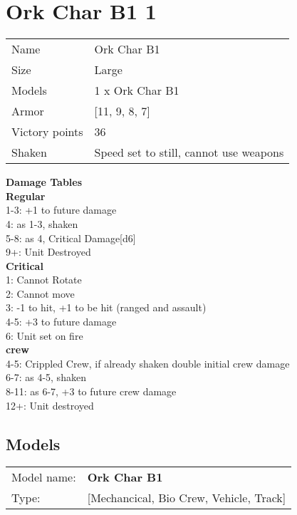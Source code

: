 \clearpage

\section{ Ork Char B1 1 }

\begin{tabular}{ll}
  Name & Ork Char B1 \\
  Size & Large\\
  Models & 1 x Ork Char B1\\
  Armor & [11, 9, 8, 7]\\
  Victory points & 36\\
  Shaken & Speed set to still, cannot use weapons\\
\end{tabular}




{\bf Damage Tables} \\
 {\bf Regular } \\
1-3: +1 to future damage \\
4: as 1-3, shaken \\
5-8: as 4, Critical Damage[d6] \\
9+: Unit Destroyed \\
 {\bf Critical } \\
1: Cannot Rotate \\
2: Cannot move \\
3: -1 to hit, +1 to be hit (ranged and assault) \\
4-5: +3 to future damage \\
6: Unit set on fire \\
 {\bf crew } \\
4-5: Crippled Crew, if already shaken double initial crew damage \\
6-7: as 4-5, shaken \\
8-11: as 6-7, +3 to future crew damage \\
12+: Unit destroyed \\


\clearpage

\subsection{ Models }

\begin{tabular}{ll}
Model name: & {\bf Ork Char B1 } \\
Type: & [Mechancical, Bio Crew, Vehicle, Track] \\
\end{tabular}

